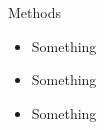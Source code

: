\begin{frame}{Methods}
	\begin{itemize}
		\item Something
		\item Something
		\item Something
	\end{itemize}

\end{frame}